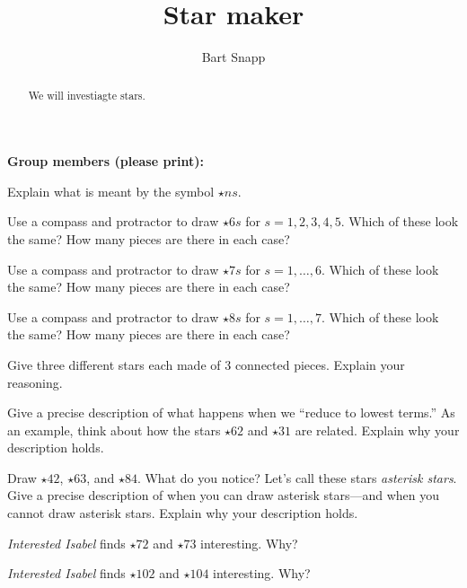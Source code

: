 \documentclass[handout,nooutcomes,noauthor]{ximera}
\title{Star maker}
\author{Bart Snapp}
\begin{document}
\begin{abstract}
  We will investiagte stars.
\end{abstract}
\maketitle

\noindent\textbf{Group members (please print):}\ \hrulefill \\

\hrulefill

\begin{problem}
  Explain what is meant by the symbol $\star{n}{s}$.
\end{problem}

\begin{problem}
  Use a compass and protractor to draw $\star{6}{s}$ for $s =
  1,2,3,4,5$. Which of these look the same? How many pieces are there in
  each case?
\end{problem}


\begin{problem} Use a compass and protractor to draw $\star{7}{s}$ for $s =
  1,\dots,6$. Which of these look the same? How many pieces are there
  in each case?
\end{problem}

\begin{problem} Use a compass and protractor to draw $\star{8}{s}$ for $s =
  1,\dots,7$. Which of these look the same? How many pieces are there
  in each case?
\end{problem}


\begin{problem}
  Give three different stars each made of 3 connected pieces. Explain
  your reasoning.
\end{problem}


\begin{problem}
  Give a precise description of what happens when we ``reduce to
  lowest terms.'' As an example, think about how the stars
  $\star{6}{2}$ and $\star{3}{1}$ are related. Explain why your
  description holds.
\end{problem}



\begin{problem}
  Draw $\star{4}{2}$, $\star{6}{3}$, and $\star{8}{4}$.  What do you
  notice? Let's call these stars \textit{asterisk stars}. Give a
  precise description of when you can draw asterisk stars---and when
  you cannot draw asterisk stars. Explain why your description holds.
\end{problem}

\begin{problem}
  \textit{Interested Isabel} finds $\star{7}{2}$ and $\star{7}{3}$
  interesting. Why?
\end{problem}

\begin{problem}
  \textit{Interested Isabel} finds $\star{10}{2}$ and $\star{10}{4}$
  interesting. Why?
\end{problem}
\end{document}
